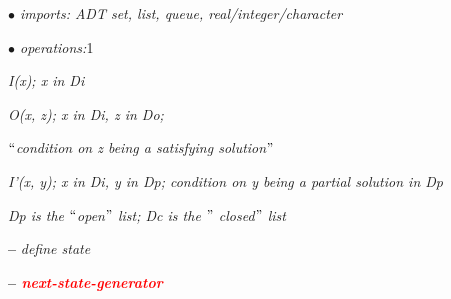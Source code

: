 \documentclass[12pt]{article}
\renewcommand{\_}{\kern-1.5pt\textunderscore\kern-1.5pt}
\begin{document}
\begin{adjustwidth}{0.58in}{-0.01in}
\textit{$\bullet$  imports:  ADT set, list, queue, real/integer/character}\par

\end{adjustwidth}

\begin{adjustwidth}{0.58in}{-0.01in}
\textit{$\bullet$  operations:}1\par

\end{adjustwidth}

\begin{adjustwidth}{0.72in}{-0.01in}
\textit{I(x); x in Di}\par

\end{adjustwidth}

\begin{adjustwidth}{0.72in}{-0.01in}
\textit{O(x, z); x in Di, z in Do;}\par

\end{adjustwidth}

\begin{adjustwidth}{0.72in}{-0.01in}
\textit{$``$condition on z being a satisfying solution$"$ }\par

\end{adjustwidth}

\begin{adjustwidth}{0.72in}{-0.01in}
\textit{I’(x, y); x in Di, y in Dp; condition on y being a partial solution in Dp}\par

\end{adjustwidth}

\begin{adjustwidth}{0.72in}{-0.01in}
\textit{Dp is the $``$open$"$  list; Dc is the $"$ closed$"$  list}\par

\end{adjustwidth}

\begin{adjustwidth}{0.83in}{-0.01in}
\textbf{–  }\textit{deﬁne state}\par

\end{adjustwidth}

\begin{adjustwidth}{0.83in}{-0.01in}
\textbf{–  \textit{\textcolor[HTML]{FF0000}{next-state-generator}}}\par

\end{adjustwidth}
\end{document}
